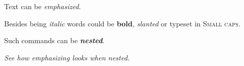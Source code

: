 \documentclass{article}
\begin{document}
Text can be \emph{emphasized}.

Besides being \textit{italic} words could be \textbf{bold},
\textsl{slanted} or typeset in \textsc{Small caps}.

Such commands can be \textit{\textbf{nested}}.

\emph{See how \emph{emphasizing} looks when nested.}
\end{document}
